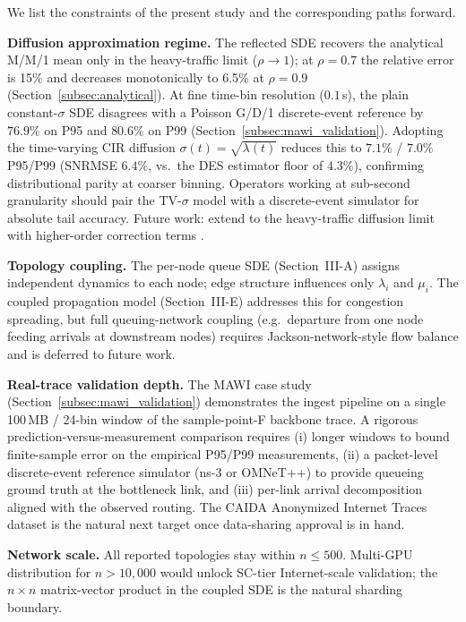 \documentclass[pdflatex,sn-mathphys-num]{sn-jnl}
\theoremstyle{thmstyleone}%
\theoremstyle{thmstyletwo}%
\theoremstyle{thmstylethree}%
\begin{document}
We list the constraints of the present study and the corresponding paths forward.

\par\textbf{Diffusion approximation regime.} The reflected SDE recovers the analytical M/M/1
mean only in the heavy-traffic limit ($\rho\!\to\!1$); at $\rho=0.7$ the relative error is 15\%
and decreases monotonically to 6.5\% at $\rho=0.9$ (Section~\ref{subsec:analytical}).  At fine
time-bin resolution ($0.1$\,s), the plain constant-$\sigma$ SDE disagrees with a Poisson G/D/1
discrete-event reference by $76.9\%$ on P95 and $80.6\%$ on P99 (Section~\ref{subsec:mawi_validation}).
Adopting the time-varying CIR diffusion $\sigma(t)=\sqrt{\lambda(t)}$ reduces this to
$7.1\%$ / $7.0\%$ P95/P99 (SNRMSE $6.4\%$, vs.\ the DES estimator floor of $4.3\%$), confirming
distributional parity at coarser binning.  Operators working at sub-second granularity should
pair the TV-$\sigma$ model with a discrete-event simulator for absolute tail accuracy.
Future work: extend to the heavy-traffic diffusion limit with higher-order correction
terms \cite{bossy2021}.

\par\textbf{Topology coupling.} The per-node queue SDE (Section~III-A) assigns independent
dynamics to each node; edge structure influences only $\lambda_i$ and $\mu_i$. The coupled
propagation model (Section~III-E) addresses this for congestion spreading, but full
queuing-network coupling (e.g.\ departure from one node feeding arrivals at downstream nodes)
requires Jackson-network-style flow balance and is deferred to future work.

\par\textbf{Real-trace validation depth.} The MAWI case study
(Section~\ref{subsec:mawi_validation}) demonstrates the ingest pipeline on a single 100\,MB /
24-bin window of the sample-point-F backbone trace. A rigorous prediction-versus-measurement
comparison requires (i) longer windows to bound finite-sample error on the empirical P95/P99
measurements, (ii) a packet-level discrete-event reference simulator (ns-3 or OMNeT++) to
provide queueing ground truth at the bottleneck link, and (iii) per-link arrival decomposition
aligned with the observed routing. The CAIDA Anonymized Internet Traces dataset is the natural
next target once data-sharing approval is in hand.

\par\textbf{Network scale.} All reported topologies stay within $n\le500$. Multi-GPU distribution
for $n>10{,}000$ would unlock SC-tier Internet-scale validation; the $n\times n$ matrix-vector
product in the coupled SDE is the natural sharding boundary.
\end{document}
